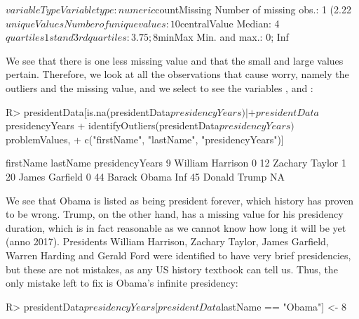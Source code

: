 \documentclass[article,shortnames]{jss}
\begin{document}
\begin{Schunk}
\begin{Soutput}
$variableType
Variable type: numeric
$countMissing
Number of missing obs.: 1 (2.22 %
$uniqueValues
Number of unique values: 10
$centralValue
Median: 4
$quartiles
1st and 3rd quartiles: 3.75; 8
$minMax
Min. and max.: 0; Inf
\end{Soutput}
\end{Schunk}

We see that there is one less missing value and that the small and large values pertain. Therefore, we look at all the observations that cause worry, namely the outliers and the missing value, and we select to see the variables ,  and :

\begin{Schunk}
\begin{Sinput}
R> presidentData[is.na(presidentData$presidencyYears) | 
+    presidentData$presidencyYears %
+    identifyOutliers(presidentData$presidencyYears)$problemValues, 
+    c("firstName", "lastName", "presidencyYears")]
\end{Sinput}
\begin{Soutput}
   firstName lastName presidencyYears
9    William Harrison               0
12   Zachary   Taylor               1
20     James Garfield               0
44    Barack    Obama             Inf
45    Donald    Trump              NA
\end{Soutput}
\end{Schunk}

We see that Obama is listed as being president forever, which history has proven to be wrong. Trump, on the other hand, has a missing value for his presidency duration, which is in fact reasonable as we cannot know how long it will be yet (anno 2017). Presidents William Harrison, Zachary Taylor, James Garfield, Warren Harding and Gerald Ford were identified to have very brief presidencies, but these are not mistakes, as any US history textbook can tell us. Thus, the only mistake left to fix is Obama's infinite presidency:


\begin{Schunk}
\begin{Sinput}
R> presidentData$presidencyYears[presidentData$lastName == "Obama"] <- 8
\end{Sinput}
\end{Schunk}
\end{document}
